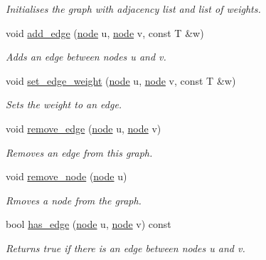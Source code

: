 \begin{DoxyCompactItemize}
\begin{DoxyCompactList}\small\item\em Initialises the graph with adjacency list and list of weights. \end{DoxyCompactList}\item 
void \hyperlink{classlgraph_1_1wugraph_a8bf315b2e763cbef5d7c6bcb7cc657f6}{add\+\_\+edge} (\hyperlink{namespacelgraph_a397169dd66adf725210a30fb7251773e}{node} u, \hyperlink{namespacelgraph_a397169dd66adf725210a30fb7251773e}{node} v, const T \&w)
\begin{DoxyCompactList}\small\item\em Adds an edge between nodes {\itshape u} and {\itshape v}. \end{DoxyCompactList}\item 
void \hyperlink{classlgraph_1_1wugraph_a6400d861723b555de718c6e7816b8a43}{set\+\_\+edge\+\_\+weight} (\hyperlink{namespacelgraph_a397169dd66adf725210a30fb7251773e}{node} u, \hyperlink{namespacelgraph_a397169dd66adf725210a30fb7251773e}{node} v, const T \&w)
\begin{DoxyCompactList}\small\item\em Sets the weight to an edge. \end{DoxyCompactList}\item 
void \hyperlink{classlgraph_1_1wugraph_a3debc0be0d08b7cfcbe942aadbe81e1f}{remove\+\_\+edge} (\hyperlink{namespacelgraph_a397169dd66adf725210a30fb7251773e}{node} u, \hyperlink{namespacelgraph_a397169dd66adf725210a30fb7251773e}{node} v)
\begin{DoxyCompactList}\small\item\em Removes an edge from this graph. \end{DoxyCompactList}\item 
void \hyperlink{classlgraph_1_1wugraph_ad8eff47efc751e7bc5aa10b79ff70633}{remove\+\_\+node} (\hyperlink{namespacelgraph_a397169dd66adf725210a30fb7251773e}{node} u)
\begin{DoxyCompactList}\small\item\em Rmoves a node from the graph. \end{DoxyCompactList}\item 
bool \hyperlink{classlgraph_1_1wugraph_a203b19538ef6662a793999973801be93}{has\+\_\+edge} (\hyperlink{namespacelgraph_a397169dd66adf725210a30fb7251773e}{node} u, \hyperlink{namespacelgraph_a397169dd66adf725210a30fb7251773e}{node} v) const
\begin{DoxyCompactList}\small\item\em Returns true if there is an edge between nodes {\itshape u} and {\itshape v}. \end{DoxyCompactList}\item 

\end{DoxyCompactItemize}
